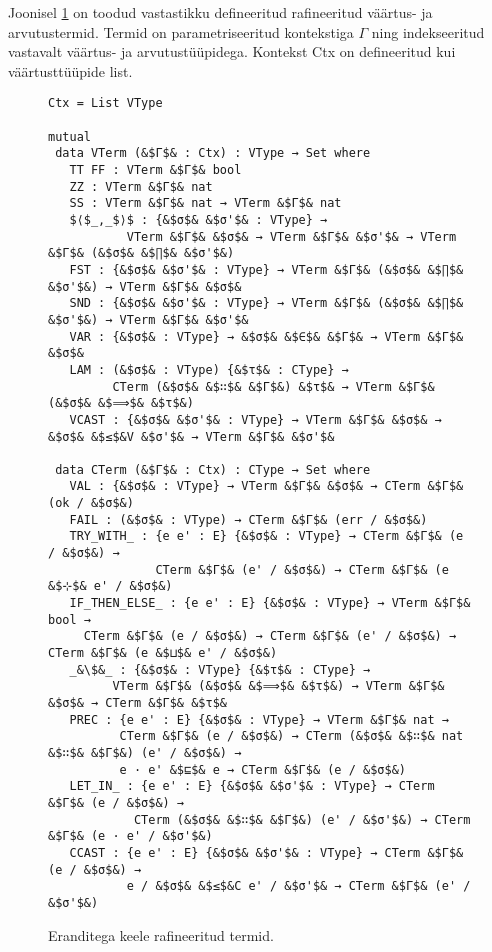\documentclass[a4paper,12pt]{article}
\begin{document}
Joonisel \ref{fig:exc.refined} on toodud vastastikku defineeritud rafineeritud väärtus- ja arvutustermid.
Termid on parametriseeritud kontekstiga $Γ$ ning indekseeritud vastavalt väärtus- ja arvutustüüpidega.
Kontekst Ctx on defineeritud kui väärtusttüüpide list.
\begin{figure}
  \begin{lstlisting}
Ctx = List VType

mutual
 data VTerm (&$Γ$& : Ctx) : VType → Set where
   TT FF : VTerm &$Γ$& bool
   ZZ : VTerm &$Γ$& nat
   SS : VTerm &$Γ$& nat → VTerm &$Γ$& nat
   $⟨$_,_$⟩$ : {&$σ$& &$σ'$& : VType} →
           VTerm &$Γ$& &$σ$& → VTerm &$Γ$& &$σ'$& → VTerm &$Γ$& (&$σ$& &$∏$& &$σ'$&)
   FST : {&$σ$& &$σ'$& : VType} → VTerm &$Γ$& (&$σ$& &$∏$& &$σ'$&) → VTerm &$Γ$& &$σ$&
   SND : {&$σ$& &$σ'$& : VType} → VTerm &$Γ$& (&$σ$& &$∏$& &$σ'$&) → VTerm &$Γ$& &$σ'$&
   VAR : {&$σ$& : VType} → &$σ$& &$∈$& &$Γ$& → VTerm &$Γ$& &$σ$&
   LAM : (&$σ$& : VType) {&$τ$& : CType} →
         CTerm (&$σ$& &$∷$& &$Γ$&) &$τ$& → VTerm &$Γ$& (&$σ$& &$⟹$& &$τ$&)
   VCAST : {&$σ$& &$σ'$& : VType} → VTerm &$Γ$& &$σ$& → &$σ$& &$≤$&V &$σ'$& → VTerm &$Γ$& &$σ'$&

 data CTerm (&$Γ$& : Ctx) : CType → Set where
   VAL : {&$σ$& : VType} → VTerm &$Γ$& &$σ$& → CTerm &$Γ$& (ok / &$σ$&)
   FAIL : (&$σ$& : VType) → CTerm &$Γ$& (err / &$σ$&)
   TRY_WITH_ : {e e' : E} {&$σ$& : VType} → CTerm &$Γ$& (e / &$σ$&) →
               CTerm &$Γ$& (e' / &$σ$&) → CTerm &$Γ$& (e &$⊹$& e' / &$σ$&)
   IF_THEN_ELSE_ : {e e' : E} {&$σ$& : VType} → VTerm &$Γ$& bool →
     CTerm &$Γ$& (e / &$σ$&) → CTerm &$Γ$& (e' / &$σ$&) → CTerm &$Γ$& (e &$⊔$& e' / &$σ$&)
   _&\$&_ : {&$σ$& : VType} {&$τ$& : CType} →
         VTerm &$Γ$& (&$σ$& &$⟹$& &$τ$&) → VTerm &$Γ$& &$σ$& → CTerm &$Γ$& &$τ$&
   PREC : {e e' : E} {&$σ$& : VType} → VTerm &$Γ$& nat →
          CTerm &$Γ$& (e / &$σ$&) → CTerm (&$σ$& &$∷$& nat &$∷$& &$Γ$&) (e' / &$σ$&) →
          e · e' &$⊑$& e → CTerm &$Γ$& (e / &$σ$&)
   LET_IN_ : {e e' : E} {&$σ$& &$σ'$& : VType} → CTerm &$Γ$& (e / &$σ$&) →
            CTerm (&$σ$& &$∷$& &$Γ$&) (e' / &$σ'$&) → CTerm &$Γ$& (e · e' / &$σ'$&)
   CCAST : {e e' : E} {&$σ$& &$σ'$& : VType} → CTerm &$Γ$& (e / &$σ$&) →
           e / &$σ$& &$≤$&C e' / &$σ'$& → CTerm &$Γ$& (e' / &$σ'$&)
  \end{lstlisting}
  \caption{Eranditega keele rafineeritud termid.}
  \label{fig:exc.refined}
\end{figure}
\end{document}
